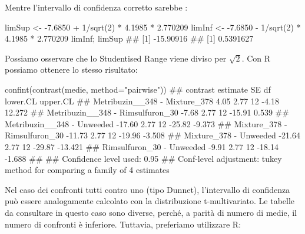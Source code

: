 \documentclass[a4paper,12pt,oneside]{book}
\newenvironment{Shaded}{}{}
\newcommand{\KeywordTok}[1]{#1}
\newcommand{\DataTypeTok}[1]{#1}
\newcommand{\DecValTok}[1]{#1}
\newcommand{\FloatTok}[1]{#1}
\newcommand{\StringTok}[1]{#1}
\newcommand{\CommentTok}[1]{#1}
\newcommand{\OperatorTok}[1]{#1}
\newcommand{\NormalTok}[1]{#1}
\begin{document}
Mentre l'intervallo di confidenza corretto sarebbe :

\begin{Shaded}
\begin{Highlighting}[]
\NormalTok{limSup <-}\StringTok{ }\FloatTok{-7.6850} \OperatorTok{+}\StringTok{ }\DecValTok{1}\OperatorTok{/}\KeywordTok{sqrt}\NormalTok{(}\DecValTok{2}\NormalTok{) }\OperatorTok{*}\StringTok{ }\FloatTok{4.1985} \OperatorTok{*}\StringTok{ }\FloatTok{2.770209}
\NormalTok{limInf <-}\StringTok{ }\FloatTok{-7.6850} \OperatorTok{-}\StringTok{ }\DecValTok{1}\OperatorTok{/}\KeywordTok{sqrt}\NormalTok{(}\DecValTok{2}\NormalTok{) }\OperatorTok{*}\StringTok{ }\FloatTok{4.1985} \OperatorTok{*}\StringTok{ }\FloatTok{2.770209}
\NormalTok{limInf; limSup}
\CommentTok{## [1] -15.90916}
\CommentTok{## [1] 0.5391627}
\end{Highlighting}
\end{Shaded}

Possiamo osservare che lo Studentised Range viene diviso per \(\sqrt{2}\). Con R possiamo ottenere lo stesso risultato:

\scriptsize

\begin{Shaded}
\begin{Highlighting}[]
\KeywordTok{confint}\NormalTok{(}\KeywordTok{contrast}\NormalTok{(medie, }\DataTypeTok{method=}\StringTok{"pairwise"}\NormalTok{))}
\CommentTok{##  contrast                         estimate   SE df lower.CL upper.CL}
\CommentTok{##  Metribuzin__348 - Mixture_378        4.05 2.77 12    -4.18   12.272}
\CommentTok{##  Metribuzin__348 - Rimsulfuron_30    -7.68 2.77 12   -15.91    0.539}
\CommentTok{##  Metribuzin__348 - Unweeded         -17.60 2.77 12   -25.82   -9.373}
\CommentTok{##  Mixture_378 - Rimsulfuron_30       -11.73 2.77 12   -19.96   -3.508}
\CommentTok{##  Mixture_378 - Unweeded             -21.64 2.77 12   -29.87  -13.421}
\CommentTok{##  Rimsulfuron_30 - Unweeded           -9.91 2.77 12   -18.14   -1.688}
\CommentTok{## }
\CommentTok{## Confidence level used: 0.95 }
\CommentTok{## Conf-level adjustment: tukey method for comparing a family of 4 estimates}
\end{Highlighting}
\end{Shaded}

\normalsize

Nel caso dei confronti tutti contro uno (tipo Dunnet), l'intervallo di confidenza può essere analogamente calcolato con la distribuzione t-multivariato. Le tabelle da consultare in questo caso sono diverse, perché, a parità di numero di medie, il numero di confronti è inferiore. Tuttavia, preferiamo utilizzare R:
\end{document}
